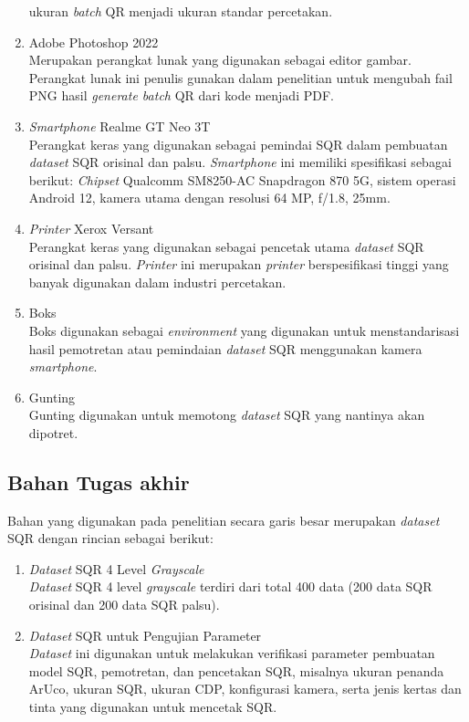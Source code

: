 \begin{enumerate}
	      ukuran \emph{batch} QR menjadi ukuran standar percetakan.
	\item Adobe Photoshop 2022\\Merupakan perangkat lunak yang digunakan sebagai editor gambar. Perangkat lunak ini penulis gunakan dalam penelitian untuk mengubah fail
	      PNG hasil \emph{generate batch} QR dari kode menjadi PDF.
	\item \emph{Smartphone} Realme GT Neo 3T\\Perangkat keras yang digunakan sebagai pemindai SQR dalam pembuatan \emph{dataset} SQR orisinal dan palsu. \emph{Smartphone} ini memiliki spesifikasi sebagai berikut: \emph{Chipset} Qualcomm SM8250-AC Snapdragon 870 5G, sistem operasi Android 12, kamera utama dengan resolusi 64 MP, f/1.8, 25mm.
	\item \emph{Printer} Xerox Versant\\Perangkat keras yang digunakan sebagai pencetak utama \emph{dataset} SQR orisinal dan palsu. \emph{Printer} ini merupakan \emph{printer} berspesifikasi tinggi yang banyak digunakan dalam industri percetakan.
	\item Boks\\Boks digunakan sebagai \emph{environment} yang digunakan untuk menstandarisasi hasil pemotretan atau pemindaian \emph{dataset} SQR menggunakan kamera
	      \emph{smartphone}.
	\item Gunting\\Gunting digunakan untuk memotong \emph{dataset} SQR yang nantinya akan dipotret.
\end{enumerate}

\subsection{Bahan Tugas akhir}

Bahan yang digunakan pada penelitian secara garis besar merupakan \emph{dataset} SQR dengan rincian sebagai berikut:

\begin{enumerate}
	\item \emph{Dataset} SQR 4 Level \emph{Grayscale}\\\emph{Dataset} SQR  4 level \emph{grayscale} terdiri dari total 400 data (200 data SQR orisinal dan 200 data SQR palsu).
	\item \emph{Dataset} SQR untuk Pengujian Parameter\\\emph{Dataset} ini digunakan untuk melakukan verifikasi parameter pembuatan model SQR, pemotretan, dan pencetakan SQR, misalnya ukuran penanda ArUco, ukuran SQR, ukuran CDP, konfigurasi kamera, serta jenis kertas dan tinta yang digunakan untuk mencetak SQR.
\end{enumerate}

